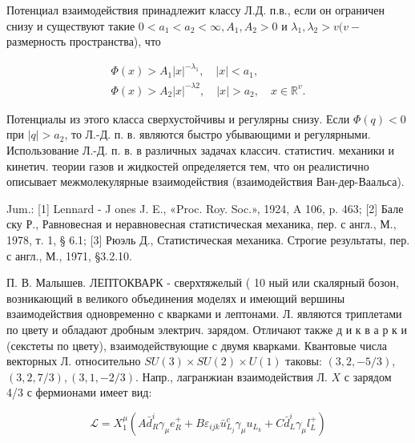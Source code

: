 \documentclass[10pt]{article}
\begin{document}
Потенциал взаимодействия принадлежит классу Л.Д. п.в., если он ограничен снизу и существуют такие $0<a_{1}<a_{2}<\infty, A_{1}, A_{2}>0$ и $\lambda_{1}, \lambda_{2}>v(v-$ размерность пространства), что



\[

\begin{gathered}

\Phi(x)>A_{1}|x|^{-\lambda_{1}}, \quad|x|<a_{1}, \\

\Phi(x)>A_{2}|x|^{-\lambda 2}, \quad|x|>a_{2}, \quad x \in \mathbb{R}^{v} .

\end{gathered}

\]



Потенциалы из этого класса сверхустойчивы и регулярны снизу. Если $\Phi(q)<0$ при $|q|>a_{2}$, то Л.-Д. п. в. являются быстро убывающими и регулярными. Использование Л.-Д. п. в. в различных задачах классич. статистич. механики и кинетич. теории газов и жидкостей определяется тем, что он реалистично описывает межмолекулярные взаимодействия (взаимодействия Ван-дер-Ваальса).



Jum.: [1] Lennard - J ones J. E., «Proc. Roy. Soc.», 1924, A 106, p. 463; [2] Бале ску Р., Равновесная и неравновесная статистическая механика, пер. с англ., М., 1978, т. 1, § 6.1; [3] Рюэль Д., Статистическая механика. Строгие результаты, пер. с англ., М., 1971, §3.2.10.



П. В. Малышев. ЛЕПТОКВАРК - сверхтяжелый ( 10 ный или скалярный бозон, возникающий в великого объединения моделях и имеющий вершины взаимодействия одновременно с кварками и лептонами. Л. являются триплетами по цвету и обладают дробным электрич. зарядом. Отличают также д и к в а р к и (секстеты по цвету), взаимодействующие с двумя кварками. Квантовые числа векторных Л. относительно $S U(3) \times S U(2) \times U(1)$ таковы: $(3,2,-5 / 3)$, $(3,2,7 / 3),(3,1,-2 / 3)$. Напр., лагранжиан взаимодействия Л. $X$ с зарядом 4/3 с фермионами имеет вид:



\[

\mathscr{L}=X_{1}^{\mu}\left(A \bar{d}_{R}^{i} \gamma_{\mu} e_{R}^{+}+B \varepsilon_{i j k} \bar{u}_{L_{j}}^{c} \gamma_{\mu} u_{L_{k}}+C \bar{d}_{L}^{i} \gamma_{\mu} l_{L}^{+}\right)

\]
\end{document}
